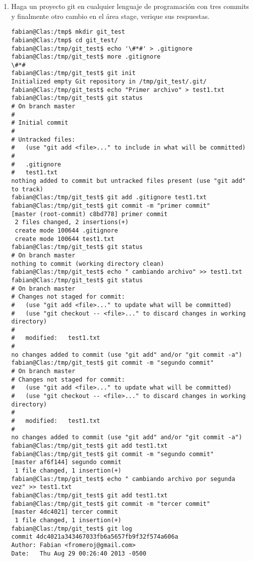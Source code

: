 \documentclass[12pt]{article}
\begin{document}
\begin{enumerate}
  \item Haga un proyecto git en cualquier lenguaje de programación con tres commits y finalmente otro cambio en el
área stage, verique sus respuestas. \hfill \\

\begin{lstlisting}[frame=single] 
fabian@Clas:/tmp$ mkdir git_test
fabian@Clas:/tmp$ cd git_test/
fabian@Clas:/tmp/git_test$ echo '\#*#' > .gitignore
fabian@Clas:/tmp/git_test$ more .gitignore 
\#*#
fabian@Clas:/tmp/git_test$ git init 
Initialized empty Git repository in /tmp/git_test/.git/
fabian@Clas:/tmp/git_test$ echo "Primer archivo" > test1.txt
fabian@Clas:/tmp/git_test$ git status
# On branch master
#
# Initial commit
#
# Untracked files:
#   (use "git add <file>..." to include in what will be committed)
#
#	.gitignore
#	test1.txt
nothing added to commit but untracked files present (use "git add" to track)
fabian@Clas:/tmp/git_test$ git add .gitignore test1.txt
fabian@Clas:/tmp/git_test$ git commit -m "primer commit"
[master (root-commit) c8bd778] primer commit
 2 files changed, 2 insertions(+)
 create mode 100644 .gitignore
 create mode 100644 test1.txt
fabian@Clas:/tmp/git_test$ git status
# On branch master
nothing to commit (working directory clean)
fabian@Clas:/tmp/git_test$ echo " cambiando archivo" >> test1.txt 
fabian@Clas:/tmp/git_test$ git status
# On branch master
# Changes not staged for commit:
#   (use "git add <file>..." to update what will be committed)
#   (use "git checkout -- <file>..." to discard changes in working directory)
#
#	modified:   test1.txt
#
no changes added to commit (use "git add" and/or "git commit -a")
fabian@Clas:/tmp/git_test$ git commit -m "segundo commit"
# On branch master
# Changes not staged for commit:
#   (use "git add <file>..." to update what will be committed)
#   (use "git checkout -- <file>..." to discard changes in working directory)
#
#	modified:   test1.txt
#
no changes added to commit (use "git add" and/or "git commit -a")
fabian@Clas:/tmp/git_test$ git add test1.txt
fabian@Clas:/tmp/git_test$ git commit -m "segundo commit"
[master af6f144] segundo commit
 1 file changed, 1 insertion(+)
fabian@Clas:/tmp/git_test$ echo " cambiando archivo por segunda vez" >> test1.txt 
fabian@Clas:/tmp/git_test$ git add test1.txt
fabian@Clas:/tmp/git_test$ git commit -m "tercer commit"
[master 4dc4021] tercer commit
 1 file changed, 1 insertion(+)
fabian@Clas:/tmp/git_test$ git log
commit 4dc4021a343467033fb6a5657fb9f32f574a606a
Author: Fabian <fromeroj@gmail.com>
Date:   Thu Aug 29 00:26:40 2013 -0500


\end{lstlisting}
\end{enumerate}
\end{document}
